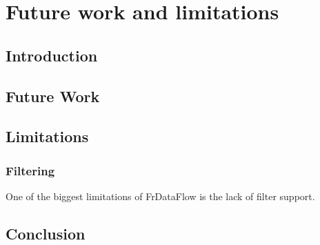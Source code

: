 \chapter{Future work and limitations}

\section{Introduction}

\section{Future Work}

\section{Limitations}

\subsection{Filtering}

One of the biggest limitations of FrDataFlow is the lack of filter support.

\section{Conclusion}



